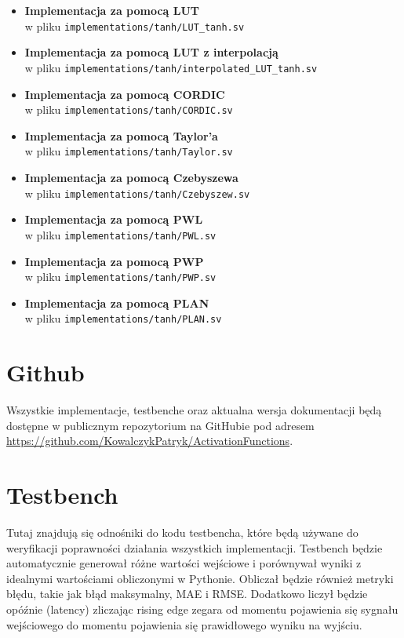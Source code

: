 \documentclass[12pt, a4paper, oneside]{scrreprt}
\begin{document}
\begin{itemize}
    \item \textbf{Implementacja za pomocą LUT} \\
    w pliku \texttt{implementations/tanh/LUT\_tanh.sv}
    \item \textbf{Implementacja za pomocą LUT z interpolacją} \\
    w pliku \texttt{implementations/tanh/interpolated\_LUT\_tanh.sv}
    \item \textbf{Implementacja za pomocą CORDIC} \\
    w pliku \texttt{implementations/tanh/CORDIC.sv}
    \item \textbf{Implementacja za pomocą Taylor'a} \\
    w pliku \texttt{implementations/tanh/Taylor.sv}
    \item \textbf{Implementacja za pomocą Czebyszewa} \\
    w pliku \texttt{implementations/tanh/Czebyszew.sv}
    \item \textbf{Implementacja za pomocą PWL} \\
    w pliku \texttt{implementations/tanh/PWL.sv}
    \item \textbf{Implementacja za pomocą PWP} \\
    w pliku \texttt{implementations/tanh/PWP.sv}
    \item \textbf{Implementacja za pomocą PLAN} \\
    w pliku \texttt{implementations/tanh/PLAN.sv}
\end{itemize}


\chapter{Github}
Wszystkie implementacje, testbenche oraz aktualna wersja dokumentacji będą dostępne w publicznym repozytorium na GitHubie pod adresem \url{https://github.com/KowalczykPatryk/ActivationFunctions}.

\chapter{Testbench}
Tutaj znajdują się odnośniki do kodu testbencha, które będą używane do weryfikacji poprawności
działania wszystkich implementacji. Testbench będzie automatycznie generował
różne wartości wejściowe i porównywał wyniki z idealnymi wartościami obliczonymi w Pythonie.
Obliczał będzie również metryki błędu, takie jak błąd maksymalny, MAE i RMSE. 
Dodatkowo liczył będzie opóźnie (latency) zliczając rising edge zegara od momentu pojawienia
się sygnału wejściowego do momentu pojawienia się prawidłowego wyniku na wyjściu.
\end{document}
